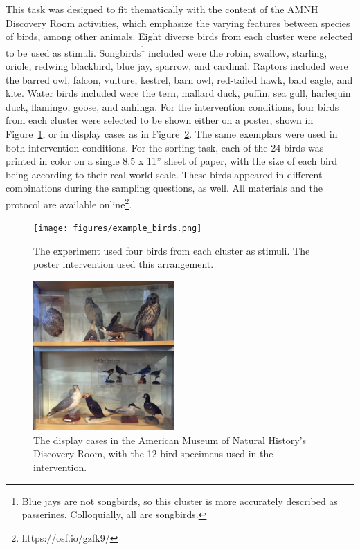 \documentclass[10pt,letterpaper]{article}
\begin{document}
This task was designed to fit thematically with the content of the AMNH Discovery Room activities, which emphasize the varying features between species of birds, among other animals. 
Eight diverse birds from each cluster were selected to be used as stimuli. Songbirds\footnote{Blue jays are not songbirds, so this cluster is more accurately described as passerines. Colloquially, all are songbirds.} included were the robin, swallow, starling, oriole, redwing blackbird, blue jay, sparrow, and cardinal. 
Raptors included were the barred owl, falcon, vulture, kestrel, barn owl, red-tailed hawk, bald eagle, and kite. 
Water birds included were the tern, mallard duck, puffin, sea gull, harlequin duck, flamingo, goose, and anhinga. 
For the intervention conditions, four birds from each cluster were selected to be shown either on a poster, shown in Figure~\ref{fig:example_birds}, or in display cases as in  Figure~\ref{fig:display_cases}. 
The same exemplars were used in both intervention conditions. For the sorting task, each of the 24 birds was printed in color on a single 8.5 x 11'' sheet of paper, with the size of each bird being according to their real-world scale. 
These birds appeared in different combinations during the sampling questions, as well.
All materials and the protocol are available online\footnote{https://osf.io/gzfk9/}. 

\begin{figure}[h]
  \centering
  \texttt{[image: figures/example\_birds.png]}
  \caption{The experiment used four birds from each cluster as stimuli. The poster intervention used this arrangement.} 
  \label{fig:example_birds}
\end{figure} 

\begin{figure}[h]
  \centering
  \includegraphics[width=0.48\textwidth]{figures/display_cases}
  \caption{The display cases in the American Museum of Natural History's Discovery Room, with the 12 bird specimens used in the intervention.} 
  \label{fig:display_cases}
\end{figure} 
\end{document}

